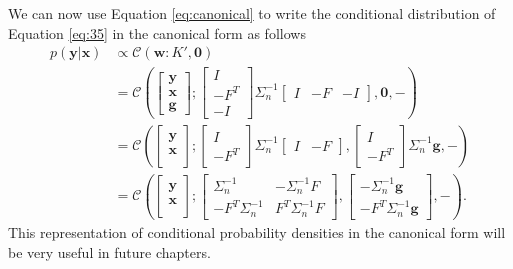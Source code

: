 \documentclass[12pt,oneside,openany,a4paper, %
afrikaans,english,
]{memoir}
\numberwithin{equation}{chapter}
\begin{document}
We can now use Equation \ref{eq:canonical} to write the conditional distribution of Equation \ref{eq:35} in the canonical form as follows
\begin{equation}
\begin{split}
p(\bm{y}|\bm{x}) & \propto \mathcal{C}(\bm{w}: K', \bm{0})\\
& =\mathcal{C}\left(
\begin{bmatrix}
\bm{y} \\
\bm{x} \\
\bm{g}
\end{bmatrix};
\begin{bmatrix}
I\\
-F^T\\
-I
\end{bmatrix}
\Sigma_n^{-1}
\begin{bmatrix}
I & -F & -I
\end{bmatrix}, \bm{0}, -
\right)\\
& =\mathcal{C}\left(
\begin{bmatrix}
\bm{y} \\
\bm{x} \\
\end{bmatrix};
\begin{bmatrix}
I\\
-F^T
\end{bmatrix}
\Sigma_n^{-1}
\begin{bmatrix}
I & -F
\end{bmatrix},
\begin{bmatrix}
I\\
-F^T
\end{bmatrix}
\Sigma_n^{-1}\bm{g}, -
\right)\\
& =\mathcal{C}\left(
\begin{bmatrix}
\bm{y} \\
\bm{x} \\
\end{bmatrix};
\begin{bmatrix}
\Sigma_n^{-1}  &  -\Sigma_n^{-1}F\\
-F^T\Sigma_n^{-1} & F^T\Sigma_n^{-1}F
\end{bmatrix}
, 
\begin{bmatrix}
-\Sigma_n^{-1}\bm{g}\\
-F^T\Sigma_n^{-1}\bm{g}
\end{bmatrix},
-
\right).
\end{split}
\end{equation}
This representation of conditional probability densities in the canonical form will be very useful in future chapters.
\end{document}

